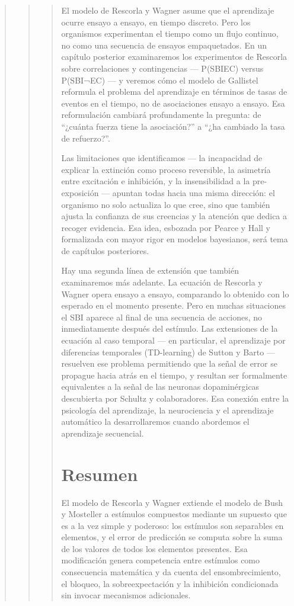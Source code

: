 \documentclass[
  letterpaper,
  DIV=11,
  numbers=noendperiod]{scrreprt}
\begin{document}
\begin{tcolorbox}[enhanced jigsaw, arc=.35mm, bottomrule=.15mm, breakable, colback=white, colframe=quarto-callout-note-color-frame, left=2mm, leftrule=.75mm, opacityback=0, rightrule=.15mm, toprule=.15mm]
\begin{quote}
\begin{quote}
\begin{quote}
El modelo de Rescorla y Wagner asume que el aprendizaje ocurre ensayo a
ensayo, en tiempo discreto. Pero los organismos experimentan el tiempo
como un flujo continuo, no como una secuencia de ensayos empaquetados.
En un capítulo posterior examinaremos los experimentos de Rescorla sobre
correlaciones y contingencias --- P(SBI\textbar EC) versus
P(SBI\textbar¬EC) --- y veremos cómo el modelo de Gallistel reformula el
problema del aprendizaje en términos de tasas de eventos en el tiempo,
no de asociaciones ensayo a ensayo. Esa reformulación cambiará
profundamente la pregunta: de ``¿cuánta fuerza tiene la asociación?'' a
``¿ha cambiado la tasa de refuerzo?''.

Las limitaciones que identificamos --- la incapacidad de explicar la
extinción como proceso reversible, la asimetría entre excitación e
inhibición, y la insensibilidad a la pre-exposición --- apuntan todas
hacia una misma dirección: el organismo no solo actualiza lo que cree,
sino que también ajusta la confianza de sus creencias y la atención que
dedica a recoger evidencia. Esa idea, esbozada por Pearce y Hall y
formalizada con mayor rigor en modelos bayesianos, será tema de
capítulos posteriores.

Hay una segunda línea de extensión que también examinaremos más
adelante. La ecuación de Rescorla y Wagner opera ensayo a ensayo,
comparando lo obtenido con lo esperado en el momento presente. Pero en
muchas situaciones el SBI aparece al final de una secuencia de acciones,
no inmediatamente después del estímulo. Las extensiones de la ecuación
al caso temporal --- en particular, el aprendizaje por diferencias
temporales (TD-learning) de Sutton y Barto --- resuelven ese problema
permitiendo que la señal de error se propague hacia atrás en el tiempo,
y resultan ser formalmente equivalentes a la señal de las neuronas
dopaminérgicas descubierta por Schultz y colaboradores. Esa conexión
entre la psicología del aprendizaje, la neurociencia y el aprendizaje
automático la desarrollaremos cuando abordemos el aprendizaje
secuencial.

\mbox{}%
\section{Resumen}\label{resumen-5}

El modelo de Rescorla y Wagner extiende el modelo de Bush y Mosteller a
estímulos compuestos mediante un supuesto que es a la vez simple y
poderoso: los estímulos son separables en elementos, y el error de
predicción se computa sobre la suma de los valores de todos los
elementos presentes. Esa modificación genera competencia entre estímulos
como consecuencia matemática y da cuenta del ensombrecimiento, el
bloqueo, la sobreexpectación y la inhibición condicionada sin invocar
mecanismos adicionales.


\end{quote}
\end{quote}
\end{quote}
\end{tcolorbox}
\end{document}

